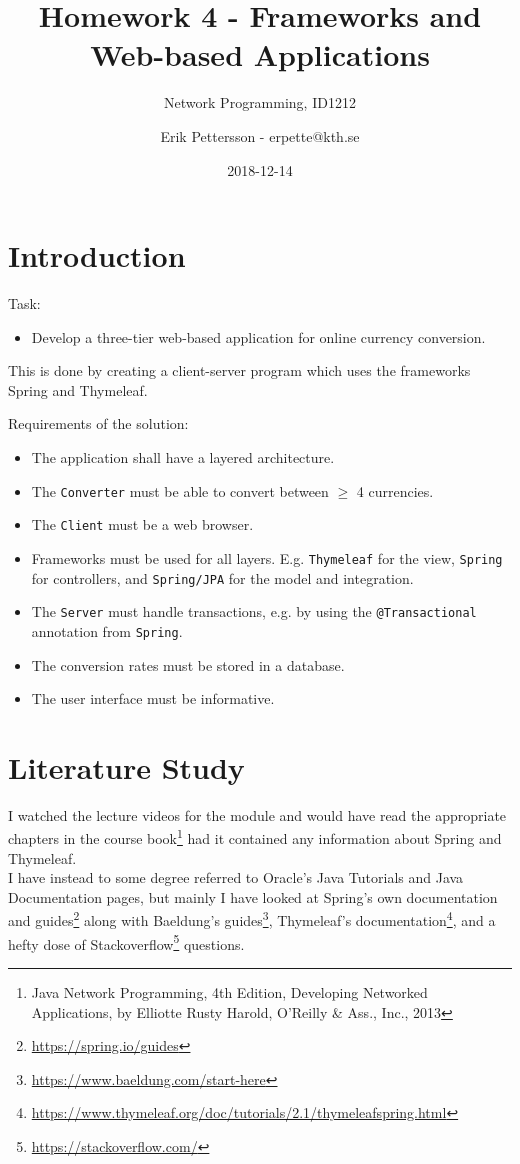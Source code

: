 \documentclass[a4paper]{scrartcl}
\title{Homework 4 - Frameworks and Web-based Applications}
\subtitle{Network Programming, ID1212}
\author{Erik Pettersson - erpette@kth.se}
\date{2018-12-14}
\begin{document}
\maketitle

\section{Introduction}

Task:
\begin{itemize}
	\item{Develop a three-tier web-based application for online currency conversion.}
\end{itemize}

This is done by creating a client-server program which uses the frameworks Spring and Thymeleaf.

Requirements of the solution:
\begin{itemize}
	\item{The application shall have a layered architecture.}
	\item{The \texttt{Converter} must be able to convert between $\geq$ 4 currencies.}
	\item{The \texttt{Client} must be a web browser.}
	\item{Frameworks must be used for all layers. E.g. \texttt{Thymeleaf} for the view, \texttt{Spring} for controllers, and \texttt{Spring/JPA} for the model and integration.}
	\item{The \texttt{Server} must handle transactions, e.g. by using the \texttt{@Transactional} annotation from \texttt{Spring}.}
	\item{The conversion rates must be stored in a database.}
	\item{The user interface must be informative.}
\end{itemize}

\newpage

\section{Literature Study}

I watched the lecture videos for the module and would have read the appropriate chapters in the course book\footnote{Java Network Programming, 4th Edition, Developing Networked Applications, by Elliotte Rusty Harold, O'Reilly \& Ass., Inc., 2013} had it contained any information about Spring and Thymeleaf.\\
I have instead to some degree referred to Oracle's Java Tutorials and Java Documentation pages, but mainly I have looked at Spring's own documentation and guides\footnote{\url{https://spring.io/guides}} along with Baeldung's guides\footnote{\url{https://www.baeldung.com/start-here}}, Thymeleaf's documentation\footnote{\url{https://www.thymeleaf.org/doc/tutorials/2.1/thymeleafspring.html}}, and a hefty dose of Stackoverflow\footnote{\url{https://stackoverflow.com/}} questions.
\end{document}
